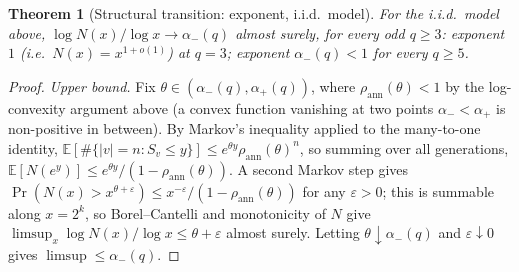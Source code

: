 \documentclass[11pt]{article}
\newtheorem{theorem}{Theorem}[section]
\theoremstyle{remark}
\begin{document}
\begin{theorem}[Structural transition: exponent, i.i.d.\ model]\label{thm:transition-model}
For the i.i.d.\ model above, $\log N(x)/\log x\to\alpha_-(q)$ almost
surely, for every odd $q\ge3$: exponent $1$ (i.e.\ $N(x)=x^{1+o(1)}$)
at $q=3$; exponent $\alpha_-(q)<1$ for every $q\ge5$.
\end{theorem}

\begin{proof}
\emph{Upper bound.} Fix $\theta\in(\alpha_-(q),\alpha_+(q))$, where
$\rho_{\mathrm{ann}}(\theta)<1$ by the log-convexity argument above (a
convex function vanishing at two points $\alpha_-<\alpha_+$ is
non-positive in between). By Markov's inequality applied to the
many-to-one identity, $\mathbb E[\#\{|v|=n:S_v\le y\}]\le
e^{\theta y}\rho_{\mathrm{ann}}(\theta)^n$, so summing over all
generations, $\mathbb E[N(e^y)]\le e^{\theta y}/(1-\rho_{\mathrm{ann}}(\theta))$.
A second Markov step gives $\Pr(N(x)>x^{\theta+\varepsilon})\le
x^{-\varepsilon}/(1-\rho_{\mathrm{ann}}(\theta))$ for any
$\varepsilon>0$; this is summable along $x=2^k$, so Borel--Cantelli and
monotonicity of $N$ give $\limsup_x\log N(x)/\log x\le\theta+\varepsilon$
almost surely. Letting $\theta\downarrow\alpha_-(q)$ and
$\varepsilon\downarrow0$ gives $\limsup\le\alpha_-(q)$.


\end{proof}
\end{document}
